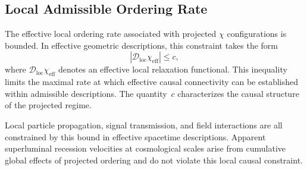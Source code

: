 \subsection{Local Admissible Ordering Rate}
  \label{subsec:local-relaxation-speed}

  The effective local ordering rate associated with projected $\chi$
  configurations is bounded.
  In effective geometric descriptions, this constraint takes the form
  \begin{equation}
    \left| \mathcal{D}_{\mathrm{loc}} \chi_{\mathrm{eff}} \right| \le c ,
    \label{eq:relaxation-constraint}
  \end{equation}
  where $\mathcal{D}_{\mathrm{loc}} \chi_{\mathrm{eff}}$ denotes an
  effective local relaxation functional.
  This inequality limits the maximal rate at which effective causal
  connectivity can be established within admissible descriptions.
  The quantity~$c$ characterizes the causal structure of the projected regime.

  Local particle propagation, signal transmission, and field interactions are
  all constrained by this bound in effective spacetime descriptions.
  Apparent superluminal recession velocities at cosmological scales arise from
  cumulative global effects of projected ordering and do not violate this
  local causal constraint.
